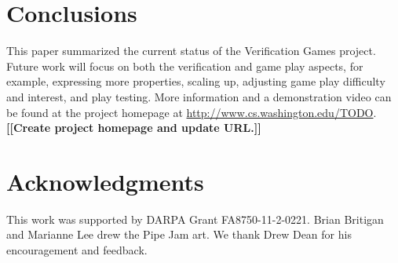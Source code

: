 \documentclass{sig-alternate}
\newcommand{\todo}[1]{{\color{red}\bfseries [[#1]]}}
\begin{document}
% 



\section{Conclusions}
\label{sec:conclusions}

This paper summarized the current status of the Verification
Games project.
Future work will focus on both the verification and game play aspects,
for example, expressing more properties, scaling up, adjusting game
play difficulty and interest, and play testing.
More information and a demonstration video can be found at the project
homepage at
\url{http://www.cs.washington.edu/TODO}.
\todo{Create project homepage and update URL.}


\section*{Acknowledgments}
 
This work was supported by DARPA Grant FA8750-11-2-0221.  Brian Britigan
and Marianne Lee drew the Pipe Jam art.  We thank Drew Dean for his
encouragement and feedback.







\balancecolumns
\end{document}
